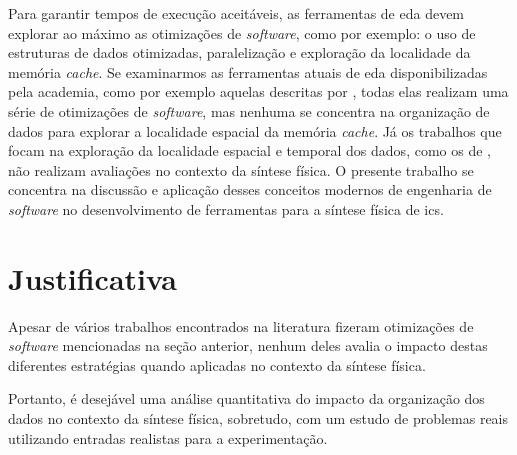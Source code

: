 Para garantir tempos de execução aceitáveis, as ferramentas de \ac{eda} devem explorar ao máximo as otimizações de \textit{software}, como por exemplo: o uso de estruturas de dados otimizadas, paralelização e exploração da localidade da memória \textit{cache}.
Se examinarmos as ferramentas atuais de \ac{eda} disponibilizadas pela academia, como por exemplo aquelas descritas por , todas elas realizam uma série de otimizações de \textit{software}, mas nenhuma se concentra na organização de dados para explorar a localidade espacial da memória \textit{cache}.
Já os trabalhos que focam na exploração da localidade espacial e temporal dos dados, como os de , não realizam avaliações no contexto da síntese física.
O presente trabalho se concentra na discussão e aplicação desses conceitos modernos de engenharia de \textit{software} no desenvolvimento de ferramentas para a síntese física de \acp{ic}.

\section{Justificativa}

    Apesar de vários trabalhos encontrados na literatura fizeram otimizações de \textit{software} mencionadas na seção anterior, nenhum deles avalia o impacto destas diferentes estratégias quando aplicadas no contexto da síntese física.

    Portanto, é desejável uma análise quantitativa do impacto da organização dos dados no contexto da síntese física, sobretudo, com um estudo de problemas reais utilizando entradas realistas para a experimentação.


